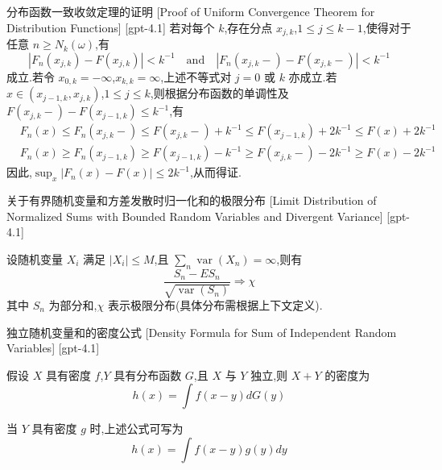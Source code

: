 \documentclass[UTF8]{ctexart}
\begin{document}
    \begin{thm}
        {分布函数一致收敛定理的证明}
        [Proof of Uniform Convergence Theorem for Distribution Functions]
        [gpt-4.1]
        若对每个 $k$,存在分点 $x_{j,k}$,$1 \leq j \leq k-1$,使得对于任意 $n \geq N_k(\omega)$,有
\[
| F_n(x_{j,k}) - F(x_{j,k}) | < k^{-1} \quad \mathrm{and} \quad | F_n(x_{j,k}-) - F(x_{j,k}-) | < k^{-1}
\]
成立.若令 $x_{0,k} = -\infty$,$x_{k,k} = \infty$,上述不等式对 $j=0$ 或 $k$ 亦成立.若 $x \in (x_{j-1,k}, x_{j,k})$,$1 \leq j \leq k$,则根据分布函数的单调性及 $F(x_{j,k}-) - F(x_{j-1,k}) \le k^{-1}$,有
\[
\begin{array}{rl}
& F_n(x) \leq F_n(x_{j,k}-) \leq F(x_{j,k}-) + k^{-1} \leq F(x_{j-1,k}) + 2k^{-1} \leq F(x) + 2k^{-1} \\
& F_n(x) \geq F_n(x_{j-1,k}) \geq F(x_{j-1,k}) - k^{-1} \geq F(x_{j,k}-) - 2k^{-1} \geq F(x) - 2k^{-1}
\end{array}
\]
因此,$\sup_{x} |F_n(x) - F(x)| \leq 2k^{-1}$,从而得证.

    \end{thm}
    
    
    
    \begin{thm}
        {关于有界随机变量和方差发散时归一化和的极限分布}
        [Limit Distribution of Normalized Sums with Bounded Random Variables and Divergent Variance]
        [gpt-4.1]
        
设随机变量 $X_i$ 满足 $|X_i| \le M$,且 $\sum_n \operatorname{var}(X_n) = \infty$,则有
\[
\frac{S_n - E S_n}{\sqrt{\operatorname{var}(S_n)}} \Rightarrow \chi
\]
其中 $S_n$ 为部分和,$\chi$ 表示极限分布(具体分布需根据上下文定义).

    \end{thm}
    
    
    
    \begin{thm}
        {独立随机变量和的密度公式}
        [Density Formula for Sum of Independent Random Variables]
        [gpt-4.1]
        
假设 $X$ 具有密度 $f$,$Y$ 具有分布函数 $G$,且 $X$ 与 $Y$ 独立,则 $X+Y$ 的密度为
\[
h(x) = \int f(x - y) dG(y)
\]

当 $Y$ 具有密度 $g$ 时,上述公式可写为
\[
h(x) = \int f(x - y) g(y) dy
\]

    \end{thm}
    
\end{document}
